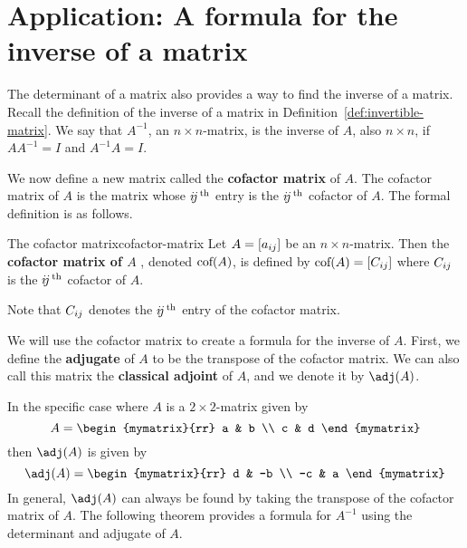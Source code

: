 \section{Application: A formula for the inverse of a matrix}

The determinant of a matrix also provides a way to find the inverse of
a matrix.  Recall the definition of the inverse of a matrix in
Definition~\ref{def:invertible-matrix}.  We say that $A^{-1}$, an
$n \times n$-matrix, is the inverse of $A$, also $n \times n$, if
$AA^{-1} = I$ and $A^{-1}A=I$.

We now define a new matrix called the \textbf{cofactor matrix} of $A$.
The cofactor matrix of $A$ is the matrix whose $\ijth$ entry is the
$\ijth$ cofactor of $A$.  The formal definition is as follows.

\begin{definition}{The cofactor matrix}{cofactor-matrix}
  Let $A=\mat{a_{ij}}$ be an $n\times n$-matrix. Then the
  \textbf{cofactor matrix of $A$}%
  , denoted $\func{cof}(A)$, is defined by
  $\func{cof}(A) =\mat{ \cof{A}{ij}} $ where $\cof{A}{ij}$ is the
  $\ijth$ cofactor of $A$.
\end{definition}

Note that $\cof{A}{ij}$ denotes the $\ijth$ entry of the cofactor
matrix.

We will use the cofactor matrix to create a formula for the inverse of
$A$. First, we define the \textbf{adjugate}%
 of $A$ to be the transpose of the cofactor matrix. We
can also call this matrix the \textbf{classical adjoint}%
 of $A$, and we denote it by
$\adj (A)$.

In the specific case where $A$ is a $2 \times 2$-matrix given by
\begin{equation*}
  A = \begin{mymatrix}{rr}
    a & b \\
    c & d
  \end{mymatrix}
\end{equation*}
then $\adj(A)$ is given by
\begin{equation*}
  \adj(A) = 
  \begin{mymatrix}{rr}
    d & -b \\
    -c & a
  \end{mymatrix}
\end{equation*}
In general, $\adj(A)$ can always be found by taking the
transpose of the cofactor matrix of $A$. The following theorem
provides a formula for $A^{-1}$ using the determinant and adjugate of
$A$.

